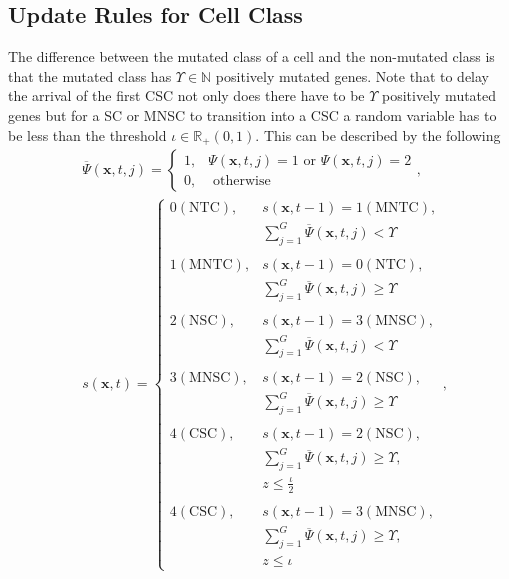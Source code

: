 \documentclass[\main/thesis.tex]{subfiles}
\begin{document}
\subsection{Update Rules for Cell Class}
The difference between the mutated class of a cell and the non-mutated class is 
that the mutated class has $\Upsilon {\in} \mathbb{N}$ positively mutated genes. 
Note that to delay the arrival of the first CSC not only does there have to be $\Upsilon$ positively mutated genes but for a SC or MNSC to transition into a CSC a random variable has to be less than the threshold $\iota {\in} \mathbb{R}_+(0, 1)$. This can be described by the following
\begin{align}
&\overline{\Psi}(\boldsymbol{x}, t, j) = 
\begin{cases}
   1, &\Psi(\boldsymbol{x}, t, j) {=} 1 \text{ or } \Psi(\boldsymbol{x}, t, j) {=} 2\\
   0, &\text{ otherwise}
\end{cases},
\label{eq:PositivelyMutatedIndicatorFunc}\\
&s(\boldsymbol{x}, t) {=} \begin{cases}
                 0 (\text{NTC}), & s(\boldsymbol{x}, t{-}1) {=} 1 (\text{MNTC}),\\
                  &\sum_{j=1}^G \overline{\Psi}(\boldsymbol{x}, t, j) {<} \Upsilon\\
                 \\
                 1 (\text{MNTC}), & s(\boldsymbol{x}, t{-}1) {=} 0 (\text{NTC}),\\
                  &\sum_{j=1}^G \overline{\Psi}(\boldsymbol{x}, t, j) {\ge} \Upsilon\\
                 \\
                 2 (\text{NSC}), & s(\boldsymbol{x}, t{-}1) {=} 3 (\text{MNSC}),\\
                  &\sum_{j=1}^G \overline{\Psi}(\boldsymbol{x}, t, j) {<} \Upsilon\\
                 \\
                 3 (\text{MNSC}), & s(\boldsymbol{x}, t{-}1) {=} 2 (\text{NSC}),\\
                  &\sum_{j=1}^G \overline{\Psi}(\boldsymbol{x}, t, j) {\ge} \Upsilon \\
                 \\
                 4 (\text{CSC}), & s(\boldsymbol{x}, t{-}1) {=} 2 (\text{NSC}),\\
                  &\sum_{j=1}^G \overline{\Psi}(\boldsymbol{x}, t, j) {\ge} \Upsilon,\\
                  & z {\le} \displaystyle \frac{\iota}{2}\\
                \\
                4 (\text{CSC}), &s(\boldsymbol{x}, t{-}1) {=} 3 (\text{MNSC}),\\
                  &\sum_{j=1}^G \overline{\Psi}(\boldsymbol{x}, t, j) {\ge} \Upsilon,\\
                  &z {\le} \iota
               \end{cases}
\label{eq:stateTransitionFunction},
\end{align}
\end{document}
